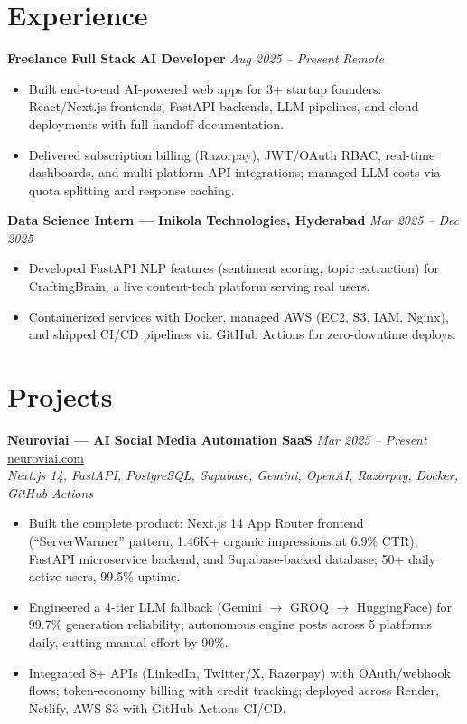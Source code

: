 \documentclass[9.5pt]{article}
\begin{document}
\section*{Experience}

\textbf{Freelance Full Stack AI Developer} \hfill \textit{Aug 2025 -- Present} \quad \textit{Remote}
\begin{itemize}
  \item Built end-to-end AI-powered web apps for 3+ startup founders: React/Next.js frontends, FastAPI backends, LLM pipelines, and cloud deployments with full handoff documentation.
  \item Delivered subscription billing (Razorpay), JWT/OAuth RBAC, real-time dashboards, and multi-platform API integrations; managed LLM costs via quota splitting and response caching.
\end{itemize}

\vspace{1.5pt}
\textbf{Data Science Intern --- Inikola Technologies, Hyderabad} \hfill \textit{Mar 2025 -- Dec 2025}
\begin{itemize}
  \item Developed FastAPI NLP features (sentiment scoring, topic extraction) for CraftingBrain, a live content-tech platform serving real users.
  \item Containerized services with Docker, managed AWS (EC2, S3, IAM, Nginx), and shipped CI/CD pipelines via GitHub Actions for zero-downtime deploys.
\end{itemize}

\section*{Projects}

\textbf{Neuroviai --- AI Social Media Automation SaaS} \hfill \textit{Mar 2025 -- Present} \quad \href{https://neuroviai.com}{neuroviai.com}\\
\textit{Next.js 14, FastAPI, PostgreSQL, Supabase, Gemini, OpenAI, Razorpay, Docker, GitHub Actions}
\begin{itemize}
  \item Built the complete product: Next.js 14 App Router frontend (``ServerWarmer'' pattern, 1.46K+ organic impressions at 6.9\% CTR), FastAPI microservice backend, and Supabase-backed database; 50+ daily active users, 99.5\% uptime.
  \item Engineered a 4-tier LLM fallback (Gemini $\rightarrow$ GROQ $\rightarrow$ HuggingFace) for 99.7\% generation reliability; autonomous engine posts across 5 platforms daily, cutting manual effort by 90\%.
  \item Integrated 8+ APIs (LinkedIn, Twitter/X, Razorpay) with OAuth/webhook flows; token-economy billing with credit tracking; deployed across Render, Netlify, AWS S3 with GitHub Actions CI/CD.
\end{itemize}
\end{document}
